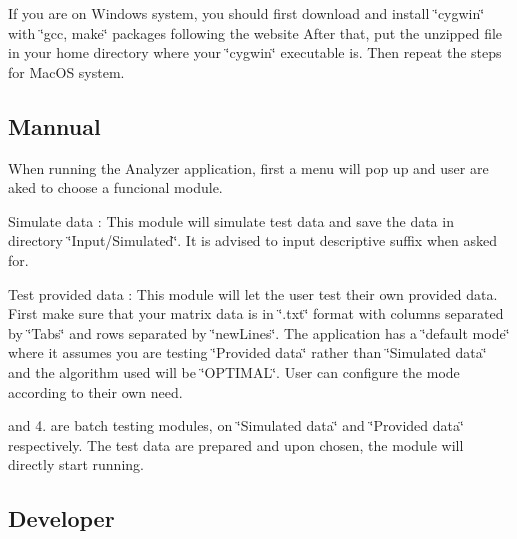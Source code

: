 If you are on Windows system, you should first download and install \char`\"{}cygwin\char`\"{} with \char`\"{}gcc, make\char`\"{} packages following the website After that, put the unzipped file in your home directory where your \char`\"{}cygwin\char`\"{} executable is. Then repeat the steps for Mac\+O\+S system.\hypertarget{index_Mannual}{}\subsection{Mannual}\label{index_Mannual}
When running the Analyzer application, first a menu will pop up and user are aked to choose a funcional module.
\begin{DoxyEnumerate}
\item Simulate data \+: This module will simulate test data and save the data in directory \char`\"{}\+Input/\+Simulated\char`\"{}. It is advised to input descriptive suffix when asked for.
\item Test provided data \+: This module will let the user test their own provided data. First make sure that your matrix data is in \char`\"{}.\+txt\char`\"{} format with columns separated by \char`\"{}\+Tabs\char`\"{} and rows separated by \char`\"{}new\+Lines\char`\"{}. The application has a \char`\"{}default mode\char`\"{} where it assumes you are testing \char`\"{}\+Provided data\char`\"{} rather than \char`\"{}\+Simulated data\char`\"{} and the algorithm used will be \char`\"{}\+O\+P\+T\+I\+M\+A\+L\char`\"{}. User can configure the mode according to their own need.
\item and 4. are batch testing modules, on \char`\"{}\+Simulated data\char`\"{} and \char`\"{}\+Provided data\char`\"{} respectively. The test data are prepared and upon chosen, the module will directly start running.
\end{DoxyEnumerate}\hypertarget{index_Developer}{}\subsection{Developer}\label{index_Developer}
